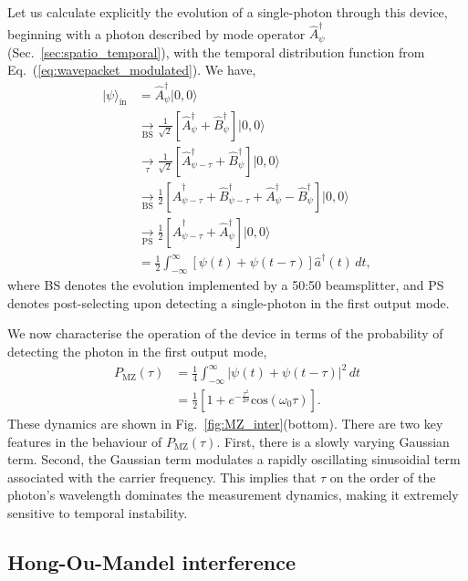\documentclass[aps, rmp, twocolumn, amsmath, amssymb, nofootinbib, superscriptaddress, longbibliography, floatfix, table-of-contents, eqsecnum]{revtex4-1}
\newcommand{\ket}[1]{|#1\rangle}
\begin{document}
Let us calculate explicitly the evolution of a single-photon through this device, beginning with a photon described by mode operator $\hat{A}^\dag_\psi$ (Sec.~\ref{sec:spatio_temporal}), with the temporal distribution function from Eq.~(\ref{eq:wavepacket_modulated}). We have,
\begin{align}
	\ket\psi_\text{in} &= \hat{A}^\dag_\psi \ket{0,0} \nonumber \\
	&\underset{\text{BS}}{\to} \frac{1}{\sqrt{2}} [\hat{A}^\dag_\psi + \hat{B}^\dag_\psi] \ket{0,0} \nonumber \\
	&\underset{\tau}{\to} \frac{1}{\sqrt{2}} [\hat{A}^\dag_{\psi-\tau} + \hat{B}^\dag_\psi] \ket{0,0} \nonumber \\
	&\underset{\text{BS}}{\to} \frac{1}{2} [\hat{A}^\dag_{\psi-\tau} + \hat{B}^\dag_{\psi-\tau} + \hat{A}^\dag_\psi - \hat{B}^\dag_\psi] \ket{0,0} \nonumber \\
	&\underset{\text{PS}}{\to} \frac{1}{2} [\hat{A}^\dag_{\psi-\tau} + \hat{A}^\dag_\psi] \ket{0,0} \nonumber \\
	&= \frac{1}{2} \int_{-\infty}^\infty [\psi(t) + \psi(t-\tau)] \hat{a}^\dag(t)\,dt,
\end{align}
where BS denotes the evolution implemented by a 50:50 beamsplitter, and PS denotes post-selecting upon detecting a single-photon in the first output mode.

We now characterise the operation of the device in terms of the probability of detecting the photon in the first output mode,
\begin{align}
P_\text{MZ}(\tau) &= \frac{1}{4} \int_{-\infty}^\infty |\psi(t) + \psi(t-\tau)|^2 \,dt \nonumber \\
&= \frac{1}{2} \left[ 1 + e^{-\frac{\tau^2}{2\sigma}}\text{cos}(\omega_0\tau) \right].
\end{align}
These dynamics are shown in Fig.~\ref{fig:MZ_inter}(bottom). There are two key features in the behaviour of $P_\text{MZ}(\tau)$. First, there is a slowly varying Gaussian term. Second, the Gaussian term modulates a rapidly oscillating sinusoidial term associated with the carrier frequency. This implies that $\tau$ on the order of the photon's wavelength dominates the measurement dynamics, making it extremely sensitive to temporal instability.

%
%

\subsection{Hong-Ou-Mandel interference}  \label{sec:HOM_inter}
\end{document}
